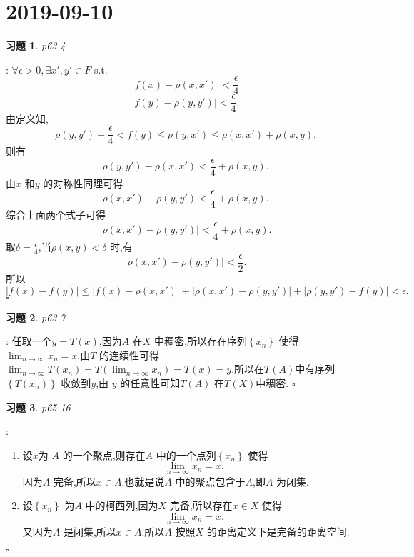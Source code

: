\documentclass[a4paper]{article}
\newtheorem*{exe}{习题}
\newenvironment{sol}{{\noindent\bfseries 解}:}{\hfill $\square$\par}
\begin{document}
\section{2019-09-10}
\begin{exe}
  p63 4	
\end{exe}
\begin{sol}
 $\forall \epsilon >0, \exists x',y'\in F$ s.t.
 \[
   \left| f(x)-\rho\left( x,x' \right)  \right| < \frac{\epsilon }{4}
 \]
 \[
   \left| f(y)-\rho(y,y') \right| <\frac{\epsilon }{4}
 .\]
 由定义知,
 \[
   \rho(y,y')-\frac{\epsilon }{4}<f(y) \le \rho(y,x')\le \rho(x,x')+\rho(x,y)
 .\] 
则有
\[
  \rho(y,y')-\rho(x,x')<\frac{\epsilon }{4}+\rho(x,y)
.\] 
由$x$ 和$y$ 的对称性同理可得
\[
  \rho(x,x')-\rho(y,y')<\frac{\epsilon }{4}+\rho(x,y)
.\] 
综合上面两个式子可得
\[
  \left| \rho(x,x')-\rho(y,y') \right| <\frac{\epsilon }{4}+\rho(x,y)
.\] 
取$\delta=\frac{\epsilon }{4}$,当$\rho(x,y)<\delta$ 时,有
\[
  \left| \rho(x,x')-\rho(y,y') \right| <\frac{\epsilon }{2}
.\] 
所以
\[
  \left| f(x)-f(y) \right| \le \left| f(x)-\rho(x,x') \right| +\left| \rho(x,x')-\rho(y,y') \right| +\left| \rho(y,y')-f(y) \right| <\epsilon 
.\] 
\end{sol}
\begin{exe}
  p63 7
\end{exe}
\begin{sol}
  任取一个$y= T(x)$,因为$A$ 在$X$ 中稠密,所以存在序列$\left\{ x_n \right\} $ 使得$\lim_{n \to \infty}x_n=x $.由$T$ 的连续性可得$\lim_{n \to \infty}T(x_n)=T(\lim_{n \to \infty}x_n)=T(x)=y  $,所以在$T(A)$中有序列 $\left\{ T(x_n) \right\} $ 收敛到$y$,由 $y$ 的任意性可知$T(A)$ 在$T(X)$中稠密.
\end{sol}
\begin{exe}
  p65 16
\end{exe}
\begin{sol}
  \begin{enumerate}
    \item 设$x$为 $A$ 的一个聚点,则存在$A$ 中的一个点列$\left\{ x_n \right\} $ 使得
      \[
      \lim_{n \to \infty} x_n=x
      .\] 
      因为$A$ 完备,所以$x\in A$.也就是说$A$ 中的聚点包含于$A$,即$A$ 为闭集.
    \item 设$\left\{ x_n \right\} $ 为$A$ 中的柯西列,因为$X$ 完备,所以存在$x\in X$ 使得
      \[
      \lim_{n \to \infty} x_n=x
      .\] 
      又因为$A$ 是闭集,所以$x\in A$.所以$A$ 按照$X$ 的距离定义下是完备的距离空间.
  \end{enumerate}
\end{sol}
\end{document}

